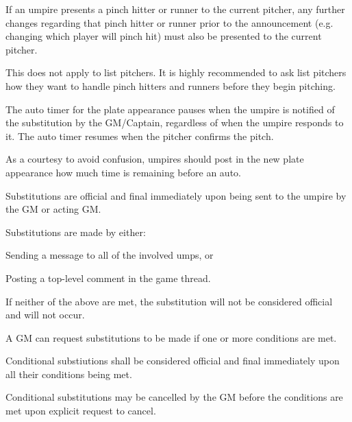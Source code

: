 \begin{deepEnumerate}
\begin{deepEnumerate}
\begin{deepEnumerate}
			\item If an umpire presents a pinch hitter or runner to the current pitcher, any further changes regarding that pinch hitter or runner prior to the announcement 
			(e.g. changing which player will pinch hit) must also be presented to the current pitcher.
			\item This does not apply to list pitchers. It is highly recommended to ask list pitchers how they want to handle pinch hitters and runners before they begin pitching.
			\item The auto timer for the plate appearance pauses when the umpire is notified of the substitution by the GM/Captain, 
			regardless of when the umpire responds to it. The auto timer resumes when the pitcher confirms the pitch.
			\begin{deepEnumerate}
				\item As a courtesy to avoid confusion, umpires should post in the new plate appearance how much time is remaining before an auto.
			\end{deepEnumerate}
		\end{deepEnumerate}
		\item Substitutions are official and final immediately upon being sent to the umpire by the GM or acting GM.
		\begin{deepEnumerate}
			\item Substitutions are made by either:
			\begin{deepEnumerate}
				\item Sending a message to all of the involved umps, or 
				\item Posting a top-level comment in the game thread.
			\end{deepEnumerate}
			\item If neither of the above are met, the substitution will not be considered official and will not occur.
			\item A GM can request substitutions to be made if one or more conditions are met.
			\begin{deepEnumerate}
				\item Conditional substiutions shall be considered official and final immediately upon all their conditions being met. 
				\item Conditional substitutions may be cancelled by the GM before the conditions are met upon explicit request to cancel.
			\end{deepEnumerate}
		\end{deepEnumerate}
	\end{deepEnumerate}

\end{deepEnumerate}
